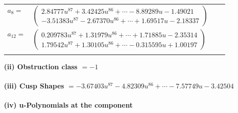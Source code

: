 \documentclass[1p]{elsarticle_modified}
\theoremstyle{definition}
\begin{document}
\begin{tabular}{m{7pt} m{180pt} m{7pt} m{180pt} }
\flushright $a_{8}=$&$\begin{pmatrix}2.84777 u^{87}+3.42425 u^{86}+\cdots-8.89289 u-1.49021\\-3.51383 u^{87}-2.67370 u^{86}+\cdots+1.69517 u-2.18337\end{pmatrix}$ \\
\flushright $a_{12}=$&$\begin{pmatrix}0.209783 u^{87}+1.31979 u^{86}+\cdots+1.71885 u-2.35314\\1.79542 u^{87}+1.30105 u^{86}+\cdots-0.315595 u+1.00197\end{pmatrix}$\\&\end{tabular}
\flushleft \textbf{(ii) Obstruction class $= -1$}\\~\\
\flushleft \textbf{(iii) Cusp Shapes $= -3.67403 u^{87}-4.82309 u^{86}+\cdots-7.57749 u-3.42504$}\\~\\
\newpage\renewcommand{\arraystretch}{1}
\flushleft \textbf{(iv) u-Polynomials at the component}\newline \\
\end{document}
